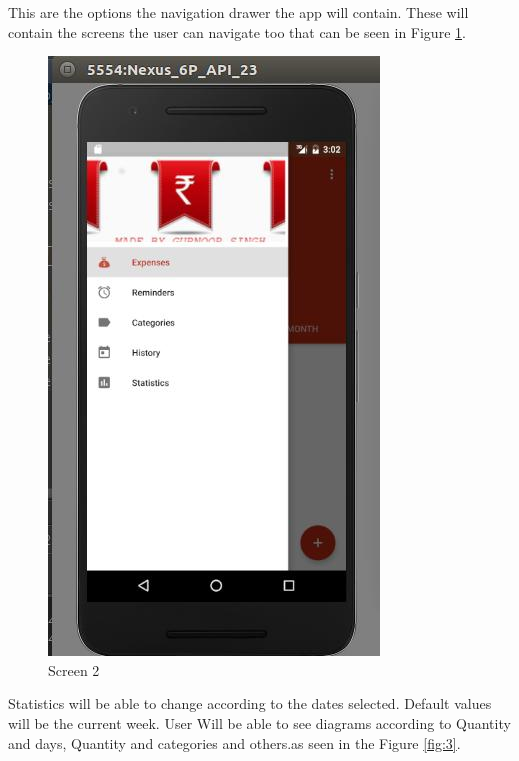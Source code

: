 \noindent This are the options the navigation drawer the app will contain. These will contain the screens the user can navigate too that can be seen in Figure \ref{fig:2}. \\

\begin{figure}[ht]
	\centering
	\includegraphics[scale=0.49]{images/s2.png}
	\caption{Screen 2}
	\label{fig:2}
\end{figure}

\noindent  Statistics will be able to change according to the dates selected. Default values will be the current week. User Will be able to see diagrams according to Quantity and
days, Quantity and categories and others.as seen in the Figure \ref{fig:3}.\\

